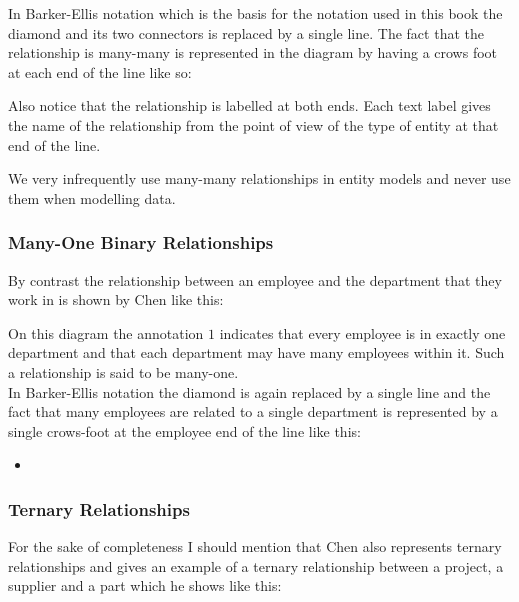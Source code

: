 \noindent In Barker-Ellis notation which is the basis for the notation used in this book the diamond and its two connectors is replaced by a single line. The fact that the relationship is many-many is represented in the diagram by having a crows foot at each end of the line like so:


\begin{center}

\end{center}

\noindent Also notice that the relationship is labelled at both ends. Each text label gives the name of the relationship from the point of view of the type of entity at that end of the line.

\noindent We very infrequently use many-many relationships in entity models and never use them when modelling data. 

\subsubsection*{Many-One Binary Relationships}
By contrast the relationship between an employee and the department that they work in is shown by Chen like this:
\begin{center}

\end{center}

\noindent On this diagram the annotation $1$ indicates that every employee is in exactly one department and that each department may have many employees within it. Such a relationship is said to be 
many-one. \\

\noindent In Barker-Ellis notation the diamond is again replaced by a single line and the fact that many employees are related to a single department is represented by a single crows-foot at the employee end of the line like this:
\begin{center}

\begin{itemize}
	\item 
\end{itemize}
\end{center}

\subsubsection*{Ternary Relationships}
For the sake of completeness I should mention that Chen also represents ternary relationships and gives an 
example of a ternary relationship between a project, a supplier and a part which he shows like this:
\begin{center}

\end{center}

